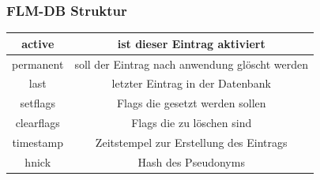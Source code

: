 \begin{frame}
	\frametitle{FLM-DB Struktur}
\begin{tabular}{|c|c|}
\hline active     & ist dieser Eintrag aktiviert \\ 
\hline permanent  & soll der Eintrag nach anwendung glöscht werden \\ 
\hline last       & letzter Eintrag in der Datenbank \\ 
\hline setflags   & Flags die gesetzt werden sollen \\ 
\hline clearflags & Flags die zu löschen sind \\
\hline timestamp  & Zeitstempel zur Erstellung des Eintrags \\
\hline hnick      & Hash des Pseudonyms \\
\hline 
\end{tabular} 
\end{frame}

